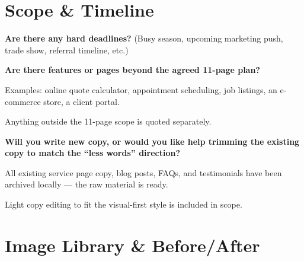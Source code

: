 \documentclass[11pt, letterpaper]{article}
\begin{document}
\section{Scope \& Timeline}

\begin{checklist}
  \item \textbf{Are there any hard deadlines?}
    (Busy season, upcoming marketing push, trade show, referral timeline, etc.)

  \item \textbf{Are there features or pages beyond the agreed 11-page plan?}
    \begin{checklist}
      \item Examples: online quote calculator, appointment scheduling, job listings,
            an e-commerce store, a client portal.
      \item Anything outside the 11-page scope is quoted separately.
    \end{checklist}

  \item \textbf{Will you write new copy, or would you like help trimming the
        existing copy to match the ``less words'' direction?}
    \begin{checklist}
      \item All existing service page copy, blog posts, FAQs, and testimonials
            have been archived locally --- the raw material is ready.
      \item Light copy editing to fit the visual-first style is included in scope.
    \end{checklist}
\end{checklist}

\section{Image Library \& Before/After}
\end{document}

